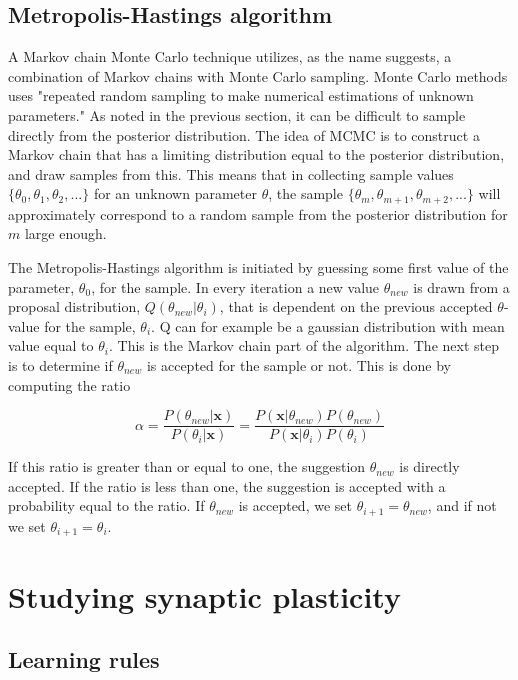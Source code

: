 \subsection{Metropolis-Hastings algorithm}
\label{Metropolis}
A Markov chain Monte Carlo technique utilizes, as the name suggests, a combination of Markov chains with Monte Carlo sampling. Monte Carlo methods uses "repeated random sampling to make numerical estimations of unknown parameters."  
As noted in the previous section, it can be difficult to sample directly from the posterior distribution. The idea of MCMC is to construct a Markov chain that has a limiting distribution equal to the posterior distribution, and draw samples from this. This means that in collecting sample values $\{\theta_0, \theta_1, \theta_2,...\}$ for an unknown parameter $\theta$, the sample $\{\theta_m, \theta_{m+1}, \theta_{m+2},...\}$ will approximately correspond to a random sample from the posterior distribution for $m$ large enough. 

The Metropolis-Hastings algorithm is initiated by guessing some first value of the parameter, $\theta_0$, for the sample. In every iteration a new value $\theta_{new}$ is drawn from a proposal distribution, $Q(\theta_{new}|\theta_i)$, that is dependent on the previous accepted $\theta$-value for the sample, $\theta_i$. Q can for example be a gaussian distribution with mean value equal to $\theta_i$. This is the Markov chain part of the algorithm. The next step is to determine if $\theta_{new}$ is accepted for the sample or not. This is done by computing the ratio

\begin{equation}
    \alpha = 
    \frac{P(\theta_{new}|{\bm x})}{P(\theta_i|{\bm x})} = 
    \frac{P({\bm x}|\theta_{new})P(\theta_{new})}{P({\bm x}|\theta_{i})P(\theta_{i})}
\end{equation}

If this ratio is greater than or equal to one, the suggestion $\theta_{new}$ is directly accepted. If the ratio is less than one, the suggestion is accepted with a probability equal to the ratio. If $\theta_{new}$ is accepted, we set $\theta_{i+1} = \theta_{new}$, and if not we set $\theta_{i+1} = \theta_i$.

\section{Studying synaptic plasticity}
\subsection{Learning rules}
\label{sec:LR}

